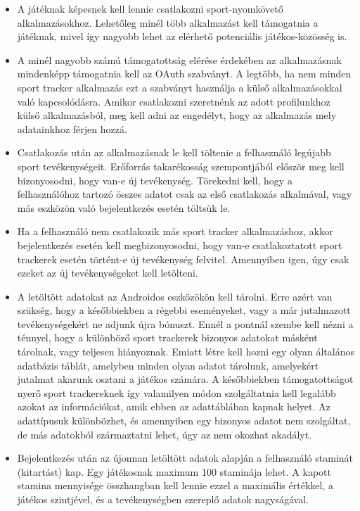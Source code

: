 \begin{itemize}
	\item 
	A játéknak képesnek kell lennie csatlakozni sport-nyomkövető alkalmazásokhoz. 
	Lehetőleg minél több alkalmazást kell támogatnia a játéknak, mivel így nagyobb lehet az elérhető potenciális játékos-közösség is. 
	\item 
	A minél nagyobb számú támogatottság elérése érdekében az alkalmazásnak mindenképp támogatnia kell az OAuth szabványt. 
	A legtöbb, ha nem minden sport tracker alkalmazás ezt a szabványt használja a külső alkalmazásokkal való kapcsolódásra. 
	Amikor csatlakozni szeretnénk az adott profilunkhoz külső alkalmazásból, meg kell adni az engedélyt, hogy az alkalmazás mely adatainkhoz férjen hozzá. 
	\item 
	Csatlakozás után az alkalmazásnak le kell töltenie a felhasználó legújabb sport tevékenységeit. 
	Erőforrás takarékosság szempontjából először meg kell bizonyosodni, hogy van-e új tevékenység. 
	Törekedni kell, hogy a felhasználóhoz tartozó összes adatot csak az első csatlakozás alkalmával, vagy más eszközön való bejelentkezés esetén töltsük le. 
	\item 
	Ha a felhasználó nem csatlakozik más sport tracker alkalmazáshoz, akkor bejelentkezés esetén kell megbizonyosodni, hogy van-e csatlakoztatott sport trackerek esetén történt-e új tevékenység felvitel. 
	Amennyiben igen, úgy csak ezeket az új tevékenységeket kell letölteni.
	\item 
	A letöltött adatokat az Androidos eszközökön kell tárolni. 
	Erre azért van szükség, hogy a későbbiekben a régebbi eseményeket, vagy a már jutalmazott tevékenységekért ne adjunk újra bónuszt. 
	Ennél a pontnál szembe kell nézni a ténnyel, hogy a különböző sport trackerek bizonyos adatokat másként tárolnak, vagy teljesen hiányoznak. 
	Emiatt létre kell hozni egy olyan általános adatbázis táblát, amelyben minden olyan adatot tárolunk, amelyekért jutalmat akarunk osztani a játékos számára. 
	A későbbiekben támogatottságot nyerő sport trackereknek így valamilyen módon szolgáltatnia kell legalább azokat az információkat, amik ebben az adattáblában kapnak helyet. 
	Az adattípusuk különbözhet, és amennyiben egy bizonyos adatot nem szolgáltat, de más adatokból származtatni lehet, úgy az nem okozhat akadályt.
	\item 
	Bejelentkezés után az újonnan letöltött adatok alapján a felhasználó staminát (kitartást) kap. 
	Egy játékosnak maximum 100 staminája lehet. 
	A kapott stamina mennyisége összhangban kell lennie ezzel a maximális értékkel, a játékos szintjével, és a tevékenységben szereplő adatok nagyságával. 

\end{itemize}
